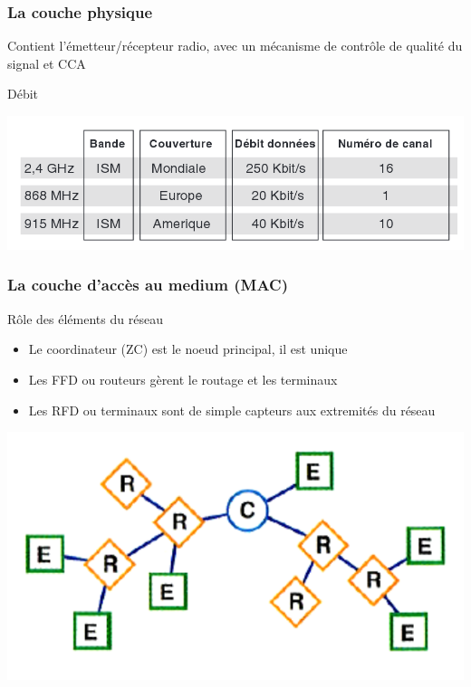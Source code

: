 \documentclass{beamer}
\begin{document}
  \begin{frame}
    \frametitle{La couche physique}
    Contient l'émetteur/récepteur radio, avec un mécanisme de contrôle de qualité du signal et CCA
    \begin{block}{Débit}
      \begin{center}
       \includegraphics[scale=0.25]{Vitesse-Zigbee.png}
      \end{center}
    \end{block}
  \end{frame}
  
  \begin{frame}
    \frametitle{La couche d'accès au medium (MAC)}
    \begin{block}{Rôle des éléments du réseau}
      \begin{itemize}
        \item Le coordinateur (ZC) est le noeud principal, il est unique
        \item Les FFD ou routeurs gèrent le routage et les terminaux
        \item Les RFD ou terminaux sont de simple capteurs aux extremités du réseau
      \end{itemize}
    \end{block}
    \begin{center}
    \includegraphics[scale=0.3]{Reseau.png}
    \end{center} 
  \end{frame}
  
\end{document}
